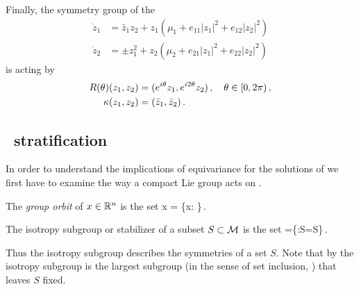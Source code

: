 \begin{example}
Finally, the symmetry group of the \AGHe
\begin{subequations}\label{eq:AGH}
\begin{align}
  \dot{z}_1 &=\bar{z}_1 z_2
              + z_1\left(\mu_1+ e_{11}|z_1|^2+e_{12}|z_2|^2\right) \\
  \dot{z}_2 &=\pm z_1^2
              + z_2\left(\mu_2+ e_{21}|z_1|^2+e_{22}|z_2|^2\right)
\end{align}
\end{subequations}
is  acting by
\begin{subequations}
\begin{align}
  \Rot{\theta}(z_1,z_2) &= (e^{i\theta} z_1, e^{i 2\theta} z_2)\,,\ \ \  \theta\in[0,2\pi)\,,\\
  \Refl(z_1,z_2) &= (\conj{z}_1,\conj{z}_2)\,.
\end{align}
\end{subequations}
\end{example}

\subsection{\Statesp\ stratification}
\label{sec:strata}

In order to understand the implications of equivariance for the solutions
of  we first have to examine the way a compact
Lie group acts on .

 The \emph{group orbit} of $x\in\mathbb{R}^{n}$ is the set
\beq
	\Gamma x = \{\gamma x: \gamma\in\Gamma\}\,.
\eeq


\begin{definition}
\label{def:stab}
 The isotropy subgroup or stabilizer of a subset $S\subset \mathcal{M}$ is the set
 \beq
  	=\{\gamma\in\Gamma:\gamma S=S\}\,.
 \eeq
\end{definition}
Thus the isotropy subgroup describes the symmetries of a set $S$. Note that by
 the isotropy subgroup is the largest subgroup (in the
sense of set inclusion, \cf {}) that leaves $S$ fixed.


